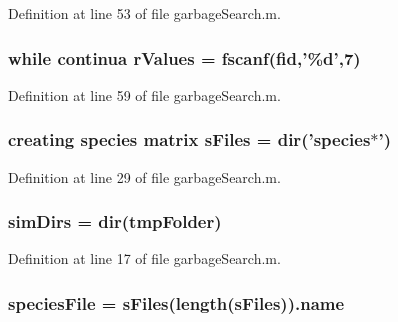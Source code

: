 Definition at line 53 of file garbage\-Search.\-m.

\hypertarget{a00021_a436a6968124e560649654a4abbd9dac6}{
\subsubsection[{r\-Values}]{\setlength{\rightskip}{0pt plus 5cm}while {\bf continua} r\-Values = {\bf fscanf}({\bf fid},'\%d',7)}}\label{a00021_a436a6968124e560649654a4abbd9dac6}


Definition at line 59 of file garbage\-Search.\-m.

\hypertarget{a00021_a0cf551ea63e8b67362ae2ab776072d1f}{
\subsubsection[{s\-Files}]{\setlength{\rightskip}{0pt plus 5cm}creating {\bf species} matrix s\-Files = {\bf dir}('{\bf species}$\ast$')}}\label{a00021_a0cf551ea63e8b67362ae2ab776072d1f}


Definition at line 29 of file garbage\-Search.\-m.

\hypertarget{a00021_aae5035eb84b89176ed5b06e136325eff}{
\subsubsection[{sim\-Dirs}]{\setlength{\rightskip}{0pt plus 5cm}sim\-Dirs = {\bf dir}({\bf tmp\-Folder})}}\label{a00021_aae5035eb84b89176ed5b06e136325eff}


Definition at line 17 of file garbage\-Search.\-m.

\hypertarget{a00021_a7da0c82834970c5f3c3d9224ab832577}{
\subsubsection[{species\-File}]{\setlength{\rightskip}{0pt plus 5cm}species\-File = {\bf s\-Files}(length({\bf s\-Files})).{\bf name}}}\label{a00021_a7da0c82834970c5f3c3d9224ab832577}


